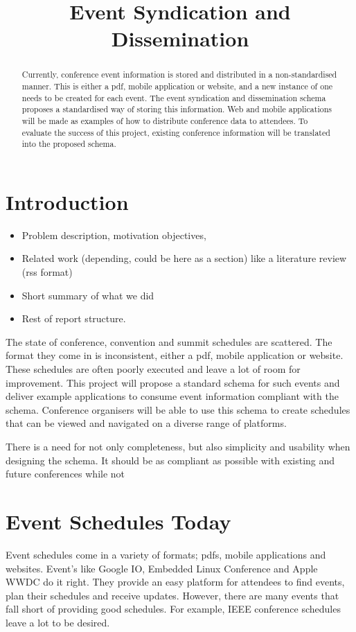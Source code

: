 \documentclass{article}
\title{Event Syndication and Dissemination}
\begin{document}


\maketitle

\begin{abstract}
Currently, conference event information is stored and distributed in a non-standardised manner. This is either a pdf, mobile application or website, and a new instance of one needs to be created for each event. The event syndication and dissemination schema proposes a standardised way of storing this information. Web and mobile applications will be made as examples of how to distribute conference data to attendees. To evaluate the success of this project, existing conference information will be translated into the proposed schema.
\end{abstract}


\section{Introduction}
\begin{itemize}
\item Problem description, motivation objectives, 
\item Related work (depending, could be here as a section)  like a literature review (rss format)
\item Short summary of what we did 
\item Rest of report structure. 
\end{itemize}

The state of conference, convention and summit schedules are scattered. The format they come in is inconsistent, either a pdf, mobile application or website. These schedules are often poorly executed and leave a lot of room for improvement. This project will propose a standard schema for such events and deliver example applications to consume event information compliant with the schema. Conference organisers will be able to use this schema to create schedules that can be viewed and navigated on a diverse range of platforms.

There is a need for not only completeness, but also simplicity and usability when designing the schema. It should be as compliant as possible with existing and future conferences while not

\section{Event Schedules Today}
Event schedules come in a variety of formats; pdfs, mobile applications and websites. Event's like Google IO\cite{googleIO2015}, Embedded Linux Conference\cite{embeddedlinuxconference2015} and Apple WWDC\cite{apple2014wwdc} do it right. They provide an easy platform for attendees to find events, plan their schedules and receive updates. However, there are many events that fall short of providing good schedules. For example, IEEE conference schedules \cite{ieeeIMC2014,ieeePSC2015,ieeeICC2014} leave a lot to be desired.
\end{document}
